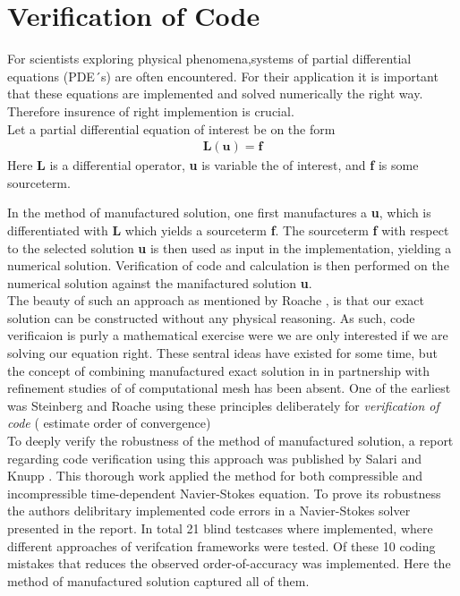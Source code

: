 \section{Verification of Code}
For scientists exploring physical phenomena,systems of partial differential equations (PDE´s) are often encountered. For their application it is important that these equations are implemented and solved numerically the right way.  Therefore insurence of right implemention is crucial. \\

Let a  partial differential equation of interest be on the form
\begin{align*}
\textbf{L}(\textbf{u}) = \textbf{f}
\end{align*}
\newpage
Here \textbf{L} is a differential operator, \textbf{u} is variable the of interest, and \textbf{f} is some sourceterm.

In the method of manufactured solution, one first manufactures a \textbf{u}, which is differentiated with \textbf{L} which yields a sourceterm  \textbf{f}. The sourceterm \textbf{f} with respect to the selected solution \textbf{u} is then used as input in the implementation, yielding a numerical solution. Verification of code and calculation is then performed on the numerical solution against the manifactured solution \textbf{u}.  \\ 

The beauty of such an approach as mentioned by Roache \cite{Roache2002}, is that our exact solution can be constructed without any physical reasoning. As such, code verificaion is purly a mathematical exercise were we are only interested if we are solving our equation right. These sentral ideas have existed for some time, but the  concept of combining manufactured exact solution in in partnership with refinement studies of of computational mesh has been absent.  One of the earliest was Steinberg and Roache \cite{Steinberg1985} using these principles deliberately for \textit{verification of code} ( estimate order of convergence)\\

To deeply verify the robustness of the method of manufactured solution,  a report regarding code verification using this approach was published by Salari and Knupp \cite{Biggs}. This thorough work applied the method for both compressible and incompressible time-dependent Navier-Stokes equation. To prove its robustness the authors  delibritary implemented  code errors in a Navier-Stokes solver presented in the report. In total 21 blind testcases where implemented, where different approaches of verifcation frameworks were tested. 
Of these 10 coding mistakes that reduces the observed order-of-accuracy was implemented. Here the method of manufactured solution captured all of them. \\

